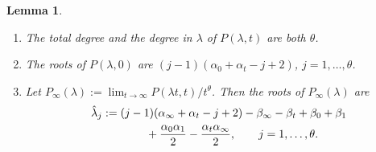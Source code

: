 \documentclass[10pt,a4paper]{amsart}
\numberwithin{equation}{section}
\newtheorem{Lemma}[Theorem]{Lemma}
\begin{document}
\begin{Lemma} \label{lemma: P in lambda} \qquad
 \begin{enumerate}\itemsep=0pt
 \item[$({\rm i})$] The total degree and the degree in $\lambda$ of
 $P(\lambda,t)$ are both $\theta$.
 \item[$({\rm ii})$] The roots of $P(\lambda,0)$ are
 $(j-1)(\alpha_0+\alpha_t-j+2)$, $j=1,\dots,\theta$.
 \item[$({\rm iii})$] Let $P_\infty(\lambda):=\lim_{t\to\infty}P(\lambda
 t,t)/t^\theta$. Then the roots of $P_\infty(\lambda)$ are
 \begin{gather}
 \hat\lambda_j:=(j-1)(\alpha_\infty+\alpha_t-j+2)
 -\beta_\infty-\beta_t+\beta_0+\beta_1\nonumber\\
 \hphantom{\hat\lambda_j:=}{} +\frac{\alpha_0\alpha_1}2
 -\frac{\alpha_t\alpha_\infty}2,\qquad j=1,\dots,\theta.\label{eq: roots infinity}
 \end{gather}
 \end{enumerate}
\end{Lemma}
\end{document}
